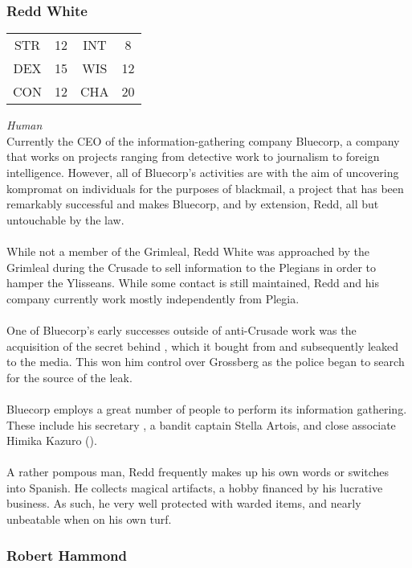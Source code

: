 \subsubsection{Redd White}
\label{people:redd}
\begin{center}
\begin{tabular}{c c|c c}
STR & 12 & INT & 8 \\
DEX & 15 & WIS & 12 \\
CON & 12 & CHA & 20 \end{tabular}\end{center}
\textit{Human}\\
Currently the CEO of the information-gathering company Bluecorp, a company that works on projects ranging from detective work to journalism to foreign intelligence. However, all of Bluecorp's activities are with the aim of uncovering kompromat on individuals for the purposes of blackmail, a project that has been remarkably successful and makes Bluecorp, and by extension, Redd, all but untouchable by the law. \\
\\
While not a member of the Grimleal, Redd White was approached by the Grimleal during the Crusade to sell information to the Plegians in order to hamper the Ylisseans. While some contact is still maintained, Redd and his company currently work mostly independently from Plegia. \\
\\
One of Bluecorp's early successes outside of anti-Crusade work was the acquisition of the secret behind , which it bought from  and subsequently leaked to the media. This won him control over Grossberg as the police began to search for the source of the leak.\\
\\
Bluecorp employs a great number of people to perform its information gathering. These include his secretary , a bandit captain Stella Artois, and close associate Himika Kazuro (). \\
\\
A rather pompous man, Redd frequently makes up his own words or switches into Spanish. He collects magical artifacts, a hobby financed by his lucrative business. As such, he very well protected with warded items, and nearly unbeatable when on his own turf. 

\subsubsection{Robert Hammond}
\label{people:hammond}

